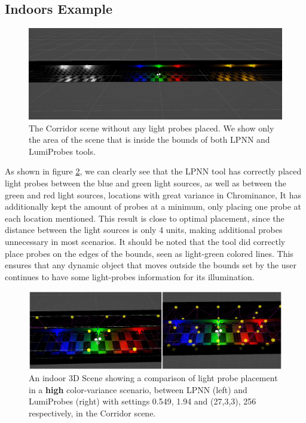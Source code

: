 \subsection{Indoors Example}

\begin{figure}[h]
	\centering
	\includegraphics[width=\linewidth]{Graphics/results/corridor.jpg}
	\caption{The Corridor scene \parencite{Corridor2021} without any light probes placed. We show only the area of the scene that is inside the bounds of both LPNN and LumiProbes tools.}
	\label{fig:corridor}
\end{figure}

As shown in figure \ref{fig:comp1}, we can clearly see that the LPNN tool has correctly placed light probes between the blue and green light sources, as well as between the green and red light sources, locations with great variance in Chrominance, It has additionally kept the amount of probes at a minimum, only placing one probe at each location mentioned. This result is close to optimal placement, since the distance between the light sources is only 4 units, making additional probes unnecessary in most scenarios. It should be noted that the tool did correctly place probes on the edges of the bounds, seen as light-green colored lines. This ensures that any dynamic object that moves outside the bounds set by the user continues to have some light-probes information for its illumination. 

\begin{figure}[h]
	\centering
	\includegraphics[width=\linewidth]{Graphics/results/concats/comparison1.png}
	\caption{An indoor 3D Scene showing a comparison of light probe placement in a \textbf{high} color-variance scenario, between LPNN (left) and LumiProbes (right) with settings 0.549, 1.94 and (27,3,3), 256 respectively, in the Corridor scene.}
	\label{fig:comp1}
\end{figure}

